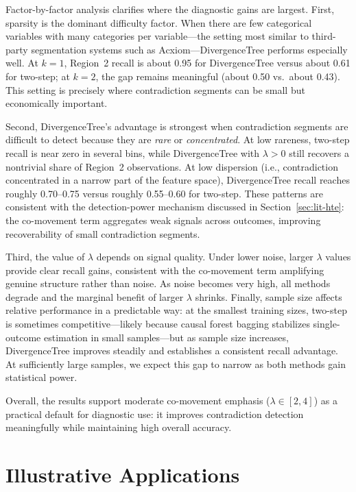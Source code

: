\documentclass[11pt,letterpaper,english]{article}
\theoremstyle{definition}
\theoremstyle{definition}
\begin{document}
\begin{bibunit}
Factor-by-factor analysis clarifies where the diagnostic gains are largest. First, sparsity is the dominant difficulty factor. When there are few categorical variables with many categories per variable---the setting most similar to third-party segmentation systems such as Acxiom---DivergenceTree performs especially well. At $k=1$, Region~2 recall is about 0.95 for DivergenceTree versus about 0.61 for two-step; at $k=2$, the gap remains meaningful (about 0.50 vs.\ about 0.43). This setting is precisely where contradiction segments can be small but economically important.

Second, DivergenceTree's advantage is strongest when contradiction segments are difficult to detect because they are \emph{rare} or \emph{concentrated}. At low rareness, two-step recall is near zero in several bins, while DivergenceTree with $\lambda>0$ still recovers a nontrivial share of Region~2 observations. At low dispersion (i.e., contradiction concentrated in a narrow part of the feature space), DivergenceTree recall reaches roughly 0.70--0.75 versus roughly 0.55--0.60 for two-step. These patterns are consistent with the detection-power mechanism discussed in Section~\ref{sec:lit-hte}: the co-movement term aggregates weak signals across outcomes, improving recoverability of small contradiction segments.

Third, the value of $\lambda$ depends on signal quality. Under lower noise, larger $\lambda$ values provide clear recall gains, consistent with the co-movement term amplifying genuine structure rather than noise. As noise becomes very high, all methods degrade and the marginal benefit of larger $\lambda$ shrinks. Finally, sample size affects relative performance in a predictable way: at the smallest training sizes, two-step is sometimes competitive---likely because causal forest bagging stabilizes single-outcome estimation in small samples---but as sample size increases, DivergenceTree improves steadily and establishes a consistent recall advantage. At sufficiently large samples, we expect this gap to narrow as both methods gain statistical power.

Overall, the results support moderate co-movement emphasis ($\lambda \in [2,4]$) as a practical default for diagnostic use: it improves contradiction detection meaningfully while maintaining high overall accuracy.


\section{Illustrative Applications}
\label{sec:applications}


\end{bibunit}
\end{document}
